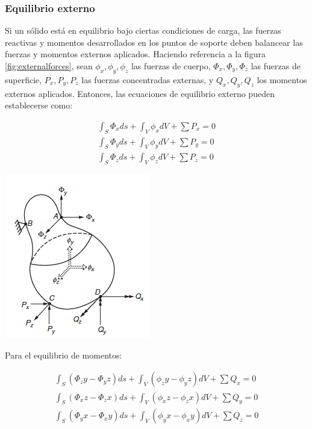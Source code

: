 \subsubsection{Equilibrio externo}

Si un sólido está en equilibrio bajo ciertas condiciones de carga, las fuerzas reactivas y momentos desarrollados en 
los puntos de soporte deben balancear las fuerzas y momentos externos aplicados. Haciendo referencia a la figura 
\ref{fig:externalforces}, sean $\phi_x, \phi_y, \phi_z$ las fuerzas de cuerpo, $\Phi_x, \Phi_y, \Phi_z$ las 
fuerzas de superficie, $P_x, P_y, P_z$ las fuerzas concentradas externas, y $Q_x, Q_y, Q_z$ los momentos externos 
aplicados. Entonces, las ecuaciones de equilibrio externo pueden establecerse como:

\begin{eqnarray}
\int_S \Phi_x ds + \int_V \phi_x dV + \sum P_x = 0 \nonumber \\
\int_S \Phi_y ds + \int_V \phi_y dV + \sum P_y = 0 \\
\int_S \Phi_z ds + \int_V \phi_z dV + \sum P_z = 0 \nonumber
\end{eqnarray}

\begin{center}
\includegraphics[scale]{src/equillibrium_force.png}
\label{fig:externalforces}
\end{center}

Para el equilibrio de momentos:

\begin{eqnarray}
\int_S (\Phi_zy - \Phi_{y}z) ds + \int_V (\phi_zy - \phi_{y}z) dV + \sum Q_x = 0 \nonumber \\
\int_S (\Phi_x z - \Phi_z x) ds + \int_V (\phi_x z - \phi_z x) dV + \sum Q_y = 0 \\
\int_S (\Phi_{y}x - \Phi_x y) ds + \int_V (\phi_{y}x - \phi_x y) dV + \sum Q_z = 0 \nonumber
\end{eqnarray}

